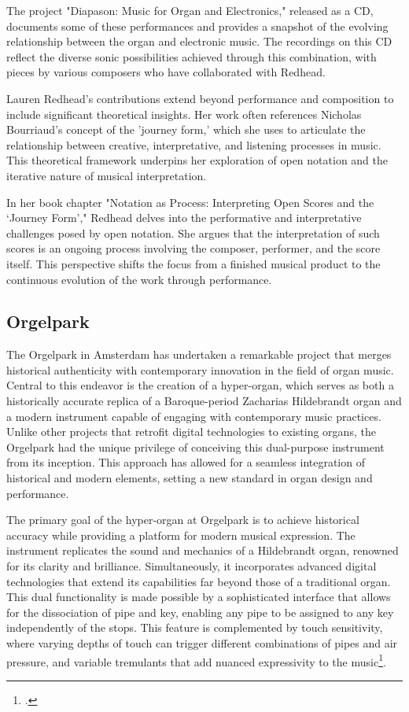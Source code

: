 \documentclass[12pt,twoside,maitrise]{dms_ks}
\theoremstyle{definition}
\begin{document}
The project "Diapason: Music for Organ and Electronics," released as a CD, documents some of these performances and provides a snapshot of the evolving relationship between the organ and electronic music. The recordings on this CD reflect the diverse sonic possibilities achieved through this combination, with pieces by various composers who have collaborated with Redhead.

Lauren Redhead’s contributions extend beyond performance and composition to include significant theoretical insights. Her work often references Nicholas Bourriaud’s concept of the 'journey form,' which she uses to articulate the relationship between creative, interpretative, and listening processes in music. This theoretical framework underpins her exploration of open notation and the iterative nature of musical interpretation.

In her book chapter "Notation as Process: Interpreting Open Scores and the ‘Journey Form’," Redhead delves into the performative and interpretative challenges posed by open notation. She argues that the interpretation of such scores is an ongoing process involving the composer, performer, and the score itself. This perspective shifts the focus from a finished musical product to the continuous evolution of the work through performance.

\subsection{Orgelpark}

The Orgelpark in Amsterdam has undertaken a remarkable project that merges historical authenticity with contemporary innovation in the field of organ music. 
Central to this endeavor is the creation of a hyper-organ, which serves as both a historically accurate replica of a Baroque-period Zacharias Hildebrandt organ and a modern instrument capable of engaging with contemporary music practices. 
Unlike other projects that retrofit digital technologies to existing organs, the Orgelpark had the unique privilege of conceiving this dual-purpose instrument from its inception. 
This approach has allowed for a seamless integration of historical and modern elements, setting a new standard in organ design and performance.

The primary goal of the hyper-organ at Orgelpark is to achieve historical accuracy while providing a platform for modern musical expression. 
The instrument replicates the sound and mechanics of a Hildebrandt organ, renowned for its clarity and brilliance. 
Simultaneously, it incorporates advanced digital technologies that extend its capabilities far beyond those of a traditional organ. 
This dual functionality is made possible by a sophisticated interface that allows for the dissociation of pipe and key, enabling any pipe to be assigned to any key independently of the stops. 
This feature is complemented by touch sensitivity, where varying depths of touch can trigger different combinations of pipes and air pressure, and variable tremulants that add nuanced expressivity to the music\footcite{fidom_digital_2014}.
\end{document}
